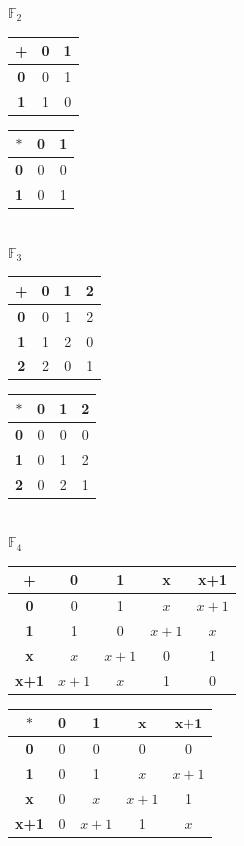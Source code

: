 \documentclass[a4paper]{article}
\begin{document}
\begin{center}
$\mathbb{F}_2 $\\
\begin{tabular}{|c|c|c|}
  \hline
  + & \textbf{0} & \textbf{1} \\
  \hline
  \textbf{0} & 0 & 1 \\
  \hline
  \textbf{1} & 1 & 0 \\
  \hline
\end{tabular}
\begin{tabular}{|c|c|c|}
  \hline
  $*$ & \textbf{0} & \textbf{1} \\
  \hline
  \textbf{0} & 0 & 0\\
  \hline
  \textbf{1} & 0 & 1\\
  \hline
\end{tabular}\\
\vspace{1\baselineskip}
$\mathbb{F}_3 $\\
\begin{tabular}{|c|c|c|c|}
  \hline
  + & \textbf{0} & \textbf{1} & \textbf{2} \\
  \hline
  \textbf{0} & 0 & 1 & 2 \\
  \hline
  \textbf{1} & 1 & 2 & 0 \\
  \hline
  \textbf{2} & 2 & 0 & 1 \\
  \hline
\end{tabular}
\begin{tabular}{|c|c|c|c|}
  \hline
  $*$ & \textbf{0} & \textbf{1} & \textbf{2} \\
  \hline
  \textbf{0} & 0 & 0 & 0 \\
  \hline
  \textbf{1} & 0 & 1 & 2 \\
  \hline
  \textbf{2} & 0 & 2 & 1 \\
  \hline
\end{tabular}\\
\vspace{1\baselineskip}
$\mathbb{F}_4$\\
\begin{tabular}{|c|c|c|c|c|}
  \hline
  + & \textbf{0} & \textbf{1} & \textbf{x} & \textbf{x+1} \\
  \hline
  \textbf{0} & 0 & 1 & $x$ & $x+1$ \\
  \hline
  \textbf{1} & 1 & 0 & $x+1$ & $x$ \\
  \hline
  \textbf{x} & $x$ & $x+1$ & 0 & 1 \\
  \hline
  \textbf{x+1} & $x+1$ & $x$ & 1 & 0 \\
  \hline
\end{tabular}
\begin{tabular}{|c|c|c|c|c|}
  \hline
  $*$ & \textbf{0} & \textbf{1} & $\textbf{x}$ & $\textbf{x+1}$ \\
  \hline
  \textbf{0} & 0 & 0 & 0 & 0 \\
  \hline
  \textbf{1} & 0 & 1 & $x$ & $x+1$ \\
  \hline
  \textbf{x} & 0 & $x$ & $x+1$ & 1 \\
  \hline
  \textbf{x+1} & 0 & $x+1$ & 1 & $x$\\
  \hline
\end{tabular}
\end{center}
\end{document}
